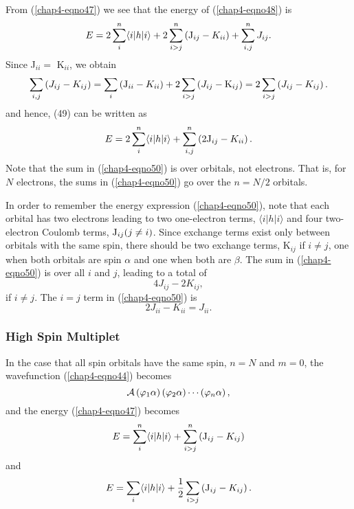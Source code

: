 {From (\ref{chap4-eqno47}) we see that the energy of (\ref{chap4-eqno48}) is
\begin{equation}
E = 2 \sum^{n}_{i} \langle i | h | i \rangle + 2 \sum^n_{i>j} \left( {\rm 
J}_{ij} - K_{ii} \right) + \sum^n_{i,j} J_{ij}.
\label{chap4-eqno49}
\end{equation}
Since J$_{ii} =$ K$_{ii}$, we obtain
\begin{equation}
\sum_{i,j} \left( J_{ij} - K_{ij} \right) = \sum_i \left( {\rm 
J}_{ii} - K_{ii} \right) + 2 \sum_{i>j} \left( J_{ij} - {\rm 
K}_{ij} \right) = 2 \sum_{i>j} \left( J_{ij} - K_{ij} \right).
\end{equation}
and hence, (49) can be written as
\begin{equation}
E = 2 \sum^n_{i} \langle i | h | i \rangle + \sum^n_{i,j} \left( 2 {\rm 
J}_{ij} - K_{ii} \right).
\label{chap4-eqno50}
\end{equation}
Note that the sum in (\ref{chap4-eqno50}) is over orbitals, not
electrons.  That is, for $N$ electrons, the sums in
(\ref{chap4-eqno50}) go over the $n = N/2$ orbitals.

In order to remember the energy expression (\ref{chap4-eqno50}), note
that each orbital has two electrons leading to two one-electron terms,
$\langle i | h | i \rangle$ and four two-electron Coulomb terms, ${\rm
J}_{ij} (j \not= i)$.  Since exchange terms exist only between
orbitals with the same spin, there should be two exchange terms,
K$_{ij}$ if $i \not= j$, one when both orbitals are spin $\alpha$ and
one when both are $\beta$.  The sum in (\ref{chap4-eqno50}) is over all $i$ and $j$,
leading to a total of
\begin{equation}
4 J_{ij} - 2 K_{ij} ,
\end{equation}
if $i \not= j$.  The $i = j$ term in (\ref{chap4-eqno50}) is
\begin{equation}
2 J_{ii} - K_{ii} = J_{ii}.
\end{equation}

\subsubsection{High Spin Multiplet}

In the case that all spin orbitals have the same spin, $n = N$ and $m = 0$, 
the wavefunction (\ref{chap4-eqno44}) becomes
\begin{equation}
{\cal A} \left( \varphi_1 \alpha \right) \left( \varphi_2 \alpha \right) \cdots 
\left( \varphi_n \alpha \right) ,
\end{equation}
and the energy (\ref{chap4-eqno47}) becomes
\begin{equation} 
E = \sum^n_i \langle i | h | i \rangle + \sum^n_{i>j} \left( {\rm 
J}_{ij} - K_{ij} \right) 
\end{equation}
and
\begin{equation}
E = \sum_i \langle i | h | i \rangle + {1 \over 2} \sum_{i>j} \left( {\rm 
J}_{ij} - K_{ij} \right) . 
\end{equation}

}
